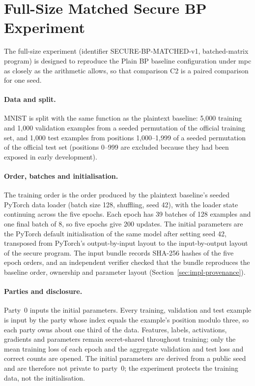 \section{Full-Size Matched Secure BP Experiment}\label{sec:method-full}
The full-size experiment (identifier SECURE-BP-MATCHED-v1, batched-matrix program) is designed to reproduce the Plain BP baseline configuration under \ac{mpc} as closely as the arithmetic allows, so that comparison C2 is a paired comparison for one seed.

\paragraph{Data and split.} MNIST is split with the same function as the plaintext baseline: 5{,}000 training and 1{,}000 validation examples from a seeded permutation of the official training set, and 1{,}000 test examples from positions 1{,}000--1{,}999 of a seeded permutation of the official test set (positions 0--999 are excluded because they had been exposed in early development).

\paragraph{Order, batches and initialisation.} The training order is the order produced by the plaintext baseline's seeded PyTorch data loader (batch size 128, shuffling, seed 42), with the loader state continuing across the five epochs. Each epoch has 39 batches of 128 examples and one final batch of 8, so five epochs give 200 updates. The initial parameters are the PyTorch default initialisation of the same model after setting seed 42, transposed from PyTorch's output-by-input layout to the input-by-output layout of the secure program. The input bundle records SHA-256 hashes of the five epoch orders, and an independent verifier checked that the bundle reproduces the baseline order, ownership and parameter layout (Section~\ref{sec:impl-provenance}).

\paragraph{Parties and disclosure.} Party~0 inputs the initial parameters. Every training, validation and test example is input by the party whose index equals the example's position modulo three, so each party owns about one third of the data. Features, labels, activations, gradients and parameters remain secret-shared throughout training; only the mean training loss of each epoch and the aggregate validation and test loss and correct counts are opened. The initial parameters are derived from a public seed and are therefore not private to party~0; the experiment protects the training data, not the initialisation.

